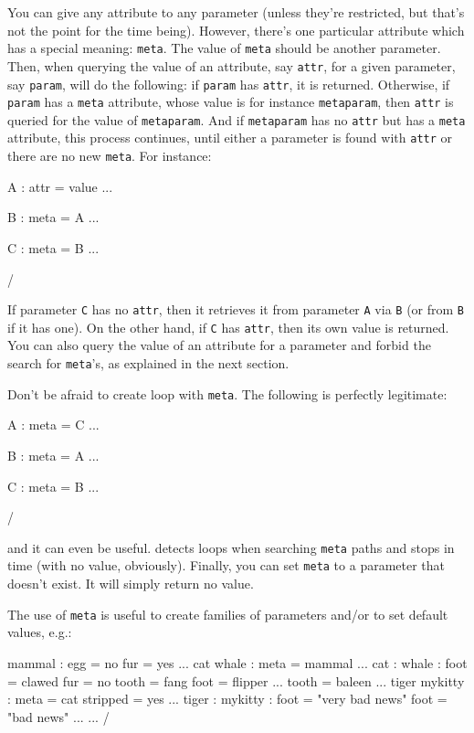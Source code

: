 \noindent You can give any attribute to any parameter (unless they're restricted,
but that's not the point for the time being).
However, there's one particular attribute which has a special meaning: \verb/meta/.
The value of \verb/meta/ should be another parameter. Then, when querying
the value of an attribute, say \verb/attr/, for a given parameter, say \verb/param/,
\yax will do the following: if \verb/param/ has \verb/attr/, it is returned.
Otherwise, if \verb/param/ has a \verb/meta/ attribute, whose value is for instance
\verb/metaparam/, then \verb/attr/ is queried for the value of \verb/metaparam/.
And if \verb/metaparam/ has no \verb/attr/ but has a \verb/meta/ attribute,
this process continues, until either a parameter is found with \verb/attr/
or there are no new \verb/meta/. For instance:

\example
\setparameter A : attr = value ... \par
\setparameter B : meta = A ... \par
\setparameter C : meta = B ... \par
\example/

\noindent If parameter \verb/C/ has no \verb/attr/, then it retrieves it
from parameter \verb/A/ via \verb/B/ (or from \verb/B/ if it has one). On
the other hand, if \verb/C/ has \verb/attr/, then its own value is returned.
You can also query the value of an attribute for a parameter and forbid the
search for \verb/meta/'s, as explained in the next section.

Don't be afraid to create loop with \verb/meta/. The following is perfectly
legitimate:

\example
\setparameter A : meta = C ... \par
\setparameter B : meta = A ... \par
\setparameter C : meta = B ... \par
\example/

\noindent and it can even be useful. \yax detects loops when searching
\verb/meta/ paths and stops in time (with no value, obviously). Finally,
you can set \verb/meta/ to a parameter that doesn't exist. It will simply
return no value. 

The use of \verb/meta/ is useful to create families
of parameters and/or to set default values, e.g.:

\example
\setparameter mammal :
  egg = no
  fur = yes
  ...
\setparameter cat whale :
  meta = mammal
  ...
\setparameter cat :     \setparameter whale :
  foot  = clawed          fur   = no
  tooth = fang            foot  = flipper
  ...                     tooth = baleen
                          ...
\setparameter tiger mykitty : 
  meta     = cat
  stripped = yes
  ...
\setparameter tiger :       \setparameter mykitty :
  foot = "very bad news"      foot = "bad news"
  ...                         ...
\example/

